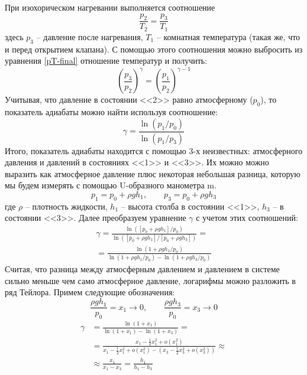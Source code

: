 \documentclass[a4paper,12pt]{report}
\begin{document}
\begin{multicols}{2}
        При изохорическом нагревании выполняется соотношение
        \begin{equation}
            \frac{p_2}{T_2}=\frac{p_3}{T_1}   
        \end{equation}
        здесь $p_3$ -- давление после нагревания, $T_1$ -- комнатная температура (такая же, что и перед открытием клапана). С помощью этого соотношения можно выбросить из уравнения \eqref{pT-final} отношение температур и получить:
        \begin{equation}
            \label{P-final}
            \left(\frac{p_3}{p_2}\right)^\gamma = \left(\frac{p_1}{p_2}\right)^{\gamma-1}
        \end{equation}
        Учитывая, что давление в состоянии <<2>> равно атмосферному ($p_0$), то показатель адиабаты можно найти используя соотношение:
        \begin{equation}
            \label{gamma}
            \gamma = \frac{\ln(p_1/p_0)}{\ln(p_1/p_3)}
        \end{equation}
        Итого, показатель адиабаты находится с помощью 3-х неизвестных: атмосферного давления и давлений в состояниях <<1>> и <<3>>. Их можно можно выразить как атмосферное давление плюс некоторая небольшая разница, которую мы будем измерять с помощью U-образного манометра m.
        \begin{equation*}
            p_1=p_0+\rho gh_1, \qquad p_3=p_0+\rho gh_3
        \end{equation*}
        где $\rho$ -- плотность жидкости, $h_1$ -- высота столба в состоянии <<1>>, $h_3$ -- в состоянии <<3>>. Далее преобразуем уравнение $\gamma$ с учетом этих соотношений:
        \begin{gather*}
            \gamma=\frac{\ln([p_0+\rho gh_1]/p_0)}{\ln([p_0+\rho gh_1]/[p_0+\rho gh_3])}=\\=\frac{\ln(1+\rho gh_1/p_0)}{\ln (1+\rho gh_1/p_0)-\ln(1+\rho gh_3/p_0)} 
        \end{gather*}
        Считая, что разница между атмосферным давлением и давлением в системе сильно меньше чем само атмосферное давление, логарифмы можно разложить в ряд Тейлора. Примем следующие обозначения:
        \begin{equation*}
            \frac{\rho gh_1}{p_0}=x_1\rightarrow0, \qquad \frac{\rho g h_3}{p_0}=x_3\rightarrow 0
        \end{equation*}
        \begin{align}
            \nonumber \gamma&=\frac{\ln(1+x_1)}{\ln(1+x_1)-\ln(1+x_3)}=\\
            \nonumber&=\frac{x_1-\frac{1}{2}x_1^2+o(x_1^2)}{x_1-\frac{1}{2}x_1^2+o(x_1^2)-(x_3-\frac{1}{2}x_3^2+o(x_3^2))}\approx\\ 
            &\approx \frac{x_1}{x_1-x_3}=\frac{h_1}{h_1-h_3} \label{final gamma via h}
        \end{align}
    \newcolumn

\end{multicols}
\end{document}
